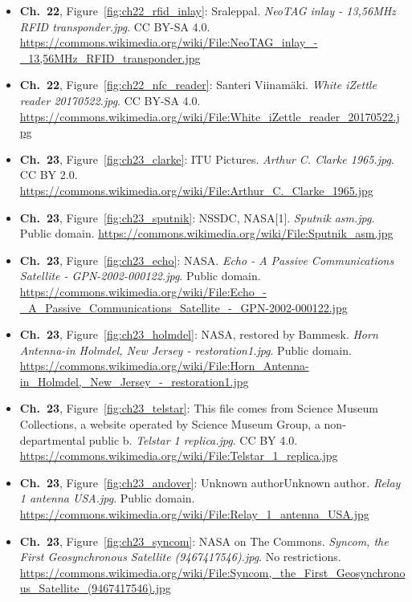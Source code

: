 \begin{small}
\begin{itemize}[leftmargin=0pt,itemsep=2pt,label={}]
\item \textbf{Ch.~22}, Figure~\ref{fig:ch22_rfid_inlay}: Sraleppal. \emph{NeoTAG inlay -\allowbreak{} 13,56MHz RFID transponder.\allowbreak{}jpg}. CC BY-SA 4.0. \url{https://commons.wikimedia.org/wiki/File:NeoTAG_inlay_-_13,56MHz_RFID_transponder.jpg}
\item \textbf{Ch.~22}, Figure~\ref{fig:ch22_nfc_reader}: Santeri Viinamäki. \emph{White iZettle reader 20170522.\allowbreak{}jpg}. CC BY-SA 4.0. \url{https://commons.wikimedia.org/wiki/File:White_iZettle_reader_20170522.jpg}
\item \textbf{Ch.~23}, Figure~\ref{fig:ch23_clarke}: ITU Pictures. \emph{Arthur C.\allowbreak{} Clarke 1965.\allowbreak{}jpg}. CC BY 2.0. \url{https://commons.wikimedia.org/wiki/File:Arthur_C._Clarke_1965.jpg}
\item \textbf{Ch.~23}, Figure~\ref{fig:ch23_sputnik}: NSSDC, NASA[1]. \emph{Sputnik asm.\allowbreak{}jpg}. Public domain. \url{https://commons.wikimedia.org/wiki/File:Sputnik_asm.jpg}
\item \textbf{Ch.~23}, Figure~\ref{fig:ch23_echo}: NASA. \emph{Echo -\allowbreak{} A Passive Communications Satellite -\allowbreak{} GPN-\allowbreak{}2002-\allowbreak{}000122.\allowbreak{}jpg}. Public domain. \url{https://commons.wikimedia.org/wiki/File:Echo_-_A_Passive_Communications_Satellite_-_GPN-2002-000122.jpg}
\item \textbf{Ch.~23}, Figure~\ref{fig:ch23_holmdel}: NASA, restored by Bammesk. \emph{Horn Antenna-\allowbreak{}in Holmdel, New Jersey -\allowbreak{} restoration1.\allowbreak{}jpg}. Public domain. \url{https://commons.wikimedia.org/wiki/File:Horn_Antenna-in_Holmdel,_New_Jersey_-_restoration1.jpg}
\item \textbf{Ch.~23}, Figure~\ref{fig:ch23_telstar}: This file comes from Science Museum Collections, a website operated by Science Museum Group, a non-departmental public b. \emph{Telstar 1 replica.\allowbreak{}jpg}. CC BY 4.0. \url{https://commons.wikimedia.org/wiki/File:Telstar_1_replica.jpg}
\item \textbf{Ch.~23}, Figure~\ref{fig:ch23_andover}: Unknown authorUnknown author. \emph{Relay 1 antenna USA.\allowbreak{}jpg}. Public domain. \url{https://commons.wikimedia.org/wiki/File:Relay_1_antenna_USA.jpg}
\item \textbf{Ch.~23}, Figure~\ref{fig:ch23_syncom}: NASA on The Commons. \emph{Syncom, the First Geosynchronous Satellite (9467417546).\allowbreak{}jpg}. No restrictions. \url{https://commons.wikimedia.org/wiki/File:Syncom,_the_First_Geosynchronous_Satellite_(9467417546).jpg}

\end{itemize}
\end{small}
